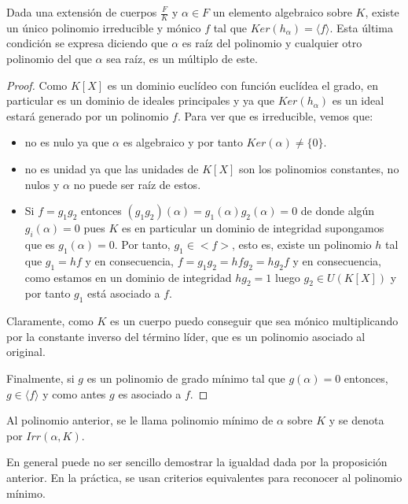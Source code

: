 \begin{proposition}
Dada una extensión de cuerpos $\frac{F}{K}$ y $\alpha \in F$ un elemento algebraico sobre $K$, existe un único polinomio irreducible y mónico $f$ tal que $Ker(h_\alpha) = \langle f \rangle$. Esta última condición se expresa diciendo que $\alpha$ es raíz del polinomio y cualquier otro polinomio del que $\alpha$ sea raíz, es un múltiplo de este. 
\end{proposition}
\begin{proof}
Como $K[X]$ es un dominio euclídeo con función euclídea el grado, en particular es un dominio de ideales principales y ya que $Ker(h_\alpha)$ es un ideal estará generado por un polinomio $f$. Para ver que es irreducible, vemos que:

\begin{itemize}
\item no es nulo ya que $\alpha$ es algebraico y por tanto $Ker(\alpha) \neq \{0\}$. 
\item no es unidad ya que las unidades de $K[X]$ son los polinomios constantes, no nulos y $\alpha$ no puede ser raíz de estos. 
\item Si $f = g_1g_2$ entonces $(g_1g_2)(\alpha) = g_1(\alpha)g_2(\alpha) = 0$ de donde algún $g_i(\alpha) = 0$ pues $K$ es en particular un dominio de integridad supongamos que es $g_1(\alpha) = 0$. Por tanto, $g_1 \in <f>$, esto es, existe un polinomio $h$ tal que $g_1 = hf$ y en consecuencia, $f = g_1g_2 = hfg_2 = hg_2f$ y en consecuencia, como estamos en un dominio de integridad $hg_2 = 1$ luego $g_2 \in U(K[X])$ y por tanto $g_1$ está asociado a $f$. 
\end{itemize}

Claramente, como $K$ es un cuerpo puedo conseguir que sea mónico multiplicando por la constante inverso del término líder, que es un polinomio asociado al original. 

Finalmente, si $g$ es un polinomio de grado mínimo tal que $g(\alpha) = 0$ entonces, $g \in \langle f \rangle$ y como antes $g$ es asociado a $f$.

\end{proof}

\begin{definition}
	Al polinomio anterior, se le llama polinomio mínimo de $\alpha$ sobre $K$ y se denota por $Irr(\alpha,K)$. 
\end{definition}

En general puede no ser sencillo demostrar la igualdad dada por la proposición anterior. En la práctica, se usan criterios equivalentes para reconocer al polinomio mínimo.

